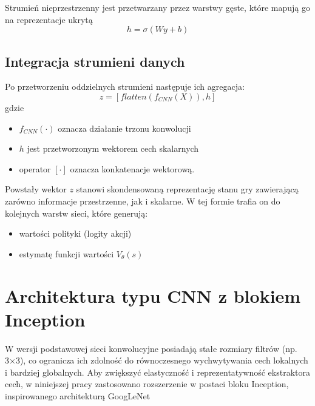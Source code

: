 Strumień nieprzestrzenny jest przetwarzany przez warstwy gęste, które mapują go na reprezentacje ukrytą
\[h = \sigma(W y +b)\]

\subsection*{Integracja strumieni danych}
Po przetworzeniu oddzielnych strumieni następuje ich agregacja:
\[
	z=[flatten(f_{CNN}(X)), h]
\]
gdzie
\begin{itemize}
	\item $f_{CNN}(\cdot)$ oznacza działanie trzonu konwolucji
	\item $h$ jest przetworzonym wektorem cech skalarnych
	\item operator $[\cdot]$ oznacza konkatenacje wektorową.
\end{itemize}

Powstały wektor $z$ stanowi skondensowaną reprezentację stanu gry zawierającą zarówno informacje przestrzenne, jak i skalarne. W tej formie trafia on do kolejnych warstw sieci, które generują:
\begin{itemize}
	\item wartości polityki (logity akcji)
	\item estymatę funkcji wartości $V_\theta(s)$
\end{itemize}

\section{Architektura typu CNN z blokiem Inception}
W wersji podstawowej sieci konwolucyjne posiadają stałe rozmiary filtrów (np. 3×3), co ogranicza ich zdolność do równoczesnego wychwytywania cech lokalnych i bardziej globalnych. Aby zwiększyć elastyczność i reprezentatywność ekstraktora cech, w niniejszej pracy zastosowano rozszerzenie w postaci bloku Inception, inspirowanego architekturą GoogLeNet

